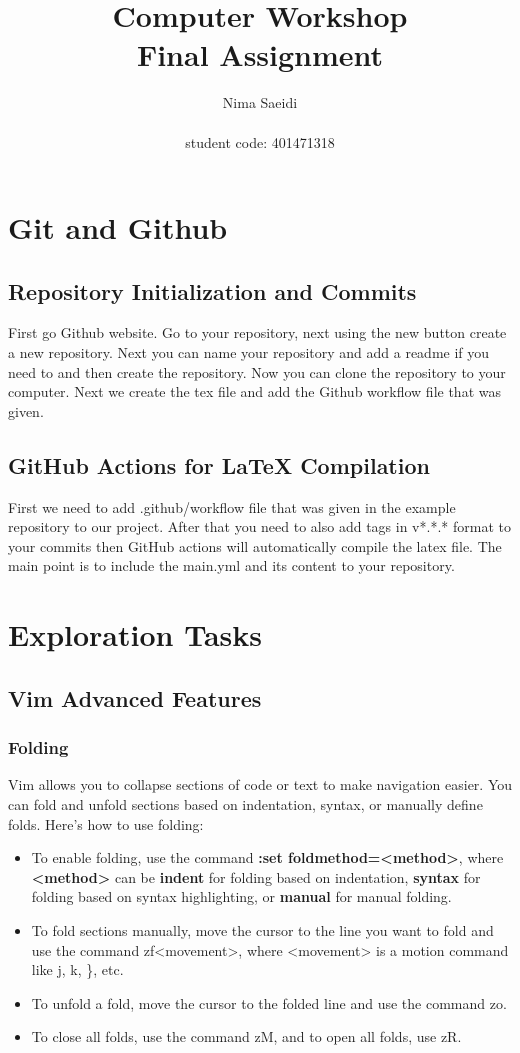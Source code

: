 \documentclass[titlepage]{article}
\title{\textbf{Computer Workshop\\ Final Assignment}}
\author{Nima Saeidi\\ \\  student code: 401471318}
\date{}
\begin{document}
\maketitle
\tableofcontents

\newpage



\section{Git and Github}
\subsection{Repository Initialization and Commits}
First go Github website. Go to your repository, next using the new button create a new repository. Next you can name your repository and add a readme if you need to and then create the repository. Now you can clone the repository to your computer. Next we create the tex file and add the Github workflow file that was given.

\subsection{GitHub Actions for LaTeX Compilation}
First we need to add .github/workflow file that was given in the example repository to our project. After that you need to also add tags in v*.*.* format to your commits then GitHub actions will automatically compile the latex file. The main point is to include the main.yml and its content to your repository.


\section{Exploration Tasks}
\subsection{Vim Advanced Features}
\subsubsection{Folding}
Vim allows you to collapse sections of code or text to make navigation easier. You can fold and unfold sections based on indentation, syntax, or manually define folds. Here's how to use folding:

\begin{itemize}
\item To enable folding, use the command \textbf{:set foldmethod=<method>}, where \textbf{<method>} can be \textbf{indent} for folding based on indentation, \textbf{syntax} for folding based on syntax highlighting, or \textbf{manual} for manual folding.
\item To fold sections manually, move the cursor to the line you want to fold and use the command zf<movement>, where <movement> is a motion command like j, k, \}, etc.
\item To unfold a fold, move the cursor to the folded line and use the command zo.
\item To close all folds, use the command zM, and to open all folds, use zR.
\end{itemize}
\end{document}
